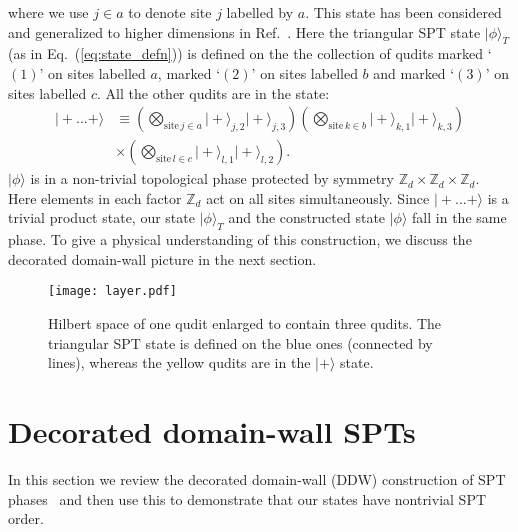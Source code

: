 \documentclass[aps,amsfonts,pra,twocolumn,showpacs]{revtex4-1}
\def\ket#1{\vert#1\rangle}
\newcommand{\zd}{\mathbb{Z}_d}
\begin{document}
where we use $j \in a$ to denote site $j$ labelled by $a$. This state has been considered and generalized to higher dimensions in Ref.~\cite{Yoshida2016}. Here the triangular SPT state $|\phi\rangle_T$ (as in Eq.~(\ref{eq:state_defn})) is defined on the the collection of qudits marked `$(1)$' on sites labelled $a$, marked `$(2)$' on sites labelled $b$ and marked `$(3)$' on sites labelled $c$. All the other qudits are in the state:
	\begin{align}
	\ket{+...+} & \equiv \left( \underset{\mathrm{site} \, j \in a}{\bigotimes} \ket+_{j, 2} \ket+_{j, 3} \right) \left( \underset{\mathrm{site} \, k \in b}{\bigotimes} \ket+_{k, 1} \ket+_{k, 3} \right) \nonumber \\
		& \times \left( \underset{\mathrm{site} \, l \in c}{\bigotimes} \ket+_{l, 1} \ket+_{l, 2} \right).
	\end{align}
$\ket\phi$ is in a non-trivial topological phase protected by symmetry $\zd \times \zd \times \zd$. Here elements in each factor $\zd$ act on all sites simultaneously. Since $\ket{+...+}$ is a trivial product state, our state $|\phi\rangle_T$ and the constructed state $|\phi\rangle$ fall in the same phase. To give a physical understanding of this construction, we discuss the decorated domain-wall picture in the next section.

\begin{figure}[h]
	\centering
	\texttt{[image: layer.pdf]}
	\caption{Hilbert space of one qudit enlarged to contain three qudits. The triangular SPT state is defined on the blue ones (connected by lines), whereas the yellow qudits are in the $\ket+$ state.} \label{fig:layer}
\end{figure}


\section{Decorated domain-wall SPTs} \label{app:DDW}
In this section we review  the decorated domain-wall (DDW) construction of SPT phases~\cite{Chen2014} and then use this to demonstrate that our states have nontrivial SPT order.
\end{document}
